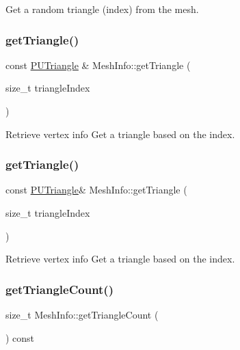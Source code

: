 Get a random triangle (index) from the mesh. \mbox{\label{classMeshInfo_a2ec71f7f8851125bf1ded381ae39e0f0}} 
\subsubsection{\texorpdfstring{get\+Triangle()}{getTriangle()}\hspace{0.1cm}{\footnotesize\ttfamily [1/2]}}
{\footnotesize\ttfamily const \hyperlink{classPUTriangle}{P\+U\+Triangle} \& Mesh\+Info\+::get\+Triangle (\begin{DoxyParamCaption}\item[{size\+\_\+t}]{triangle\+Index }\end{DoxyParamCaption})}

Retrieve vertex info Get a triangle based on the index. \mbox{\label{classMeshInfo_ac99e33607524d3122b2545f85f52aa16}} 
\subsubsection{\texorpdfstring{get\+Triangle()}{getTriangle()}\hspace{0.1cm}{\footnotesize\ttfamily [2/2]}}
{\footnotesize\ttfamily const \hyperlink{classPUTriangle}{P\+U\+Triangle}\& Mesh\+Info\+::get\+Triangle (\begin{DoxyParamCaption}\item[{size\+\_\+t}]{triangle\+Index }\end{DoxyParamCaption})}

Retrieve vertex info Get a triangle based on the index. \mbox{\label{classMeshInfo_a5e2ff519d1987d26101a6e40527a9571}} 
\subsubsection{\texorpdfstring{get\+Triangle\+Count()}{getTriangleCount()}\hspace{0.1cm}{\footnotesize\ttfamily [1/2]}}
{\footnotesize\ttfamily size\+\_\+t Mesh\+Info\+::get\+Triangle\+Count (\begin{DoxyParamCaption}{ }\end{DoxyParamCaption}) const\hspace{0.3cm}{\ttfamily [inline]}}

